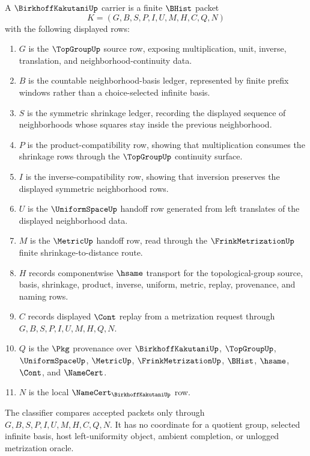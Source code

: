\begin{definition}
\label{def:birkhoff-kakutani-carrier}
A $\BirkhoffKakutaniUp$ carrier is a finite $\BHist$ packet
$$
K=(G,B,S,P,I,U,M,H,C,Q,N)
$$
with the following displayed rows:
\begin{enumerate}
\item $G$ is the $\TopGroupUp$ source row, exposing multiplication, unit, inverse, translation, and neighborhood-continuity data.
\item $B$ is the countable neighborhood-basis ledger, represented by finite prefix windows rather than a choice-selected infinite basis.
\item $S$ is the symmetric shrinkage ledger, recording the displayed sequence of neighborhoods whose squares stay inside the previous neighborhood.
\item $P$ is the product-compatibility row, showing that multiplication consumes the shrinkage rows through the $\TopGroupUp$ continuity surface.
\item $I$ is the inverse-compatibility row, showing that inversion preserves the displayed symmetric neighborhood rows.
\item $U$ is the $\UniformSpaceUp$ handoff row generated from left translates of the displayed neighborhood data.
\item $M$ is the $\MetricUp$ handoff row, read through the $\FrinkMetrizationUp$ finite shrinkage-to-distance route.
\item $H$ records componentwise $\hsame$ transport for the topological-group source, basis, shrinkage, product, inverse, uniform, metric, replay, provenance, and naming rows.
\item $C$ records displayed $\Cont$ replay from a metrization request through $G,B,S,P,I,U,M,H,Q,N$.
\item $Q$ is the $\Pkg$ provenance over $\BirkhoffKakutaniUp$, $\TopGroupUp$, $\UniformSpaceUp$, $\MetricUp$, $\FrinkMetrizationUp$, $\BHist$, $\hsame$, $\Cont$, and $\NameCert$.
\item $N$ is the local $\NameCert_{\BirkhoffKakutaniUp}$ row.
\end{enumerate}
The classifier compares accepted packets only through $G,B,S,P,I,U,M,H,C,Q,N$. It has no coordinate for a quotient group, selected infinite basis, host left-uniformity object, ambient completion, or unlogged metrization oracle.
\end{definition}

